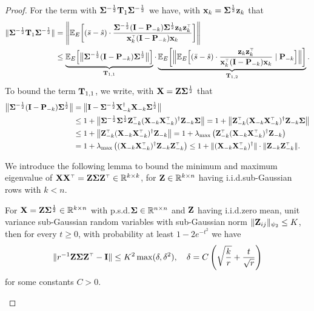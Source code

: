 \documentclass[11pt]{article}
\begin{document}
\begin{proof}
For the term with $\mathbf{\Sigma}^{-\frac12}\mathbf{T}_1 \mathbf{\Sigma}^{-\frac12}$ we have, with $\mathbf x_k = \mathbf{\Sigma}^{\frac12} \mathbf z_k$ that
\begin{align*}
      \|\Sigmab^{-\frac12}\T_1 \Sigmab^{-\frac12}\| &=  \left\| \E_E\bigg[(\bar s - \hat s)\cdot
            \frac{ \Sigmab^{-\frac12} ( \I - \P_{-k}) \Sigmab^{\frac12} \z_k\z_k^\top}{\x_k^\top ( \I - \P_{-k}) \x_k}\bigg] \right\|\\
      &\leq
     \underbrace{\E_E\Big[\big\|\Sigmab^{-\frac12} (\I - \P_{-k}) \Sigmab^{\frac12}\big\|\Big]}_{\T_{1,1}}
     \cdot
     \underbrace{\E_E\bigg[\Big\|\E_E\Big[(\bar s- \hat s)\cdot
     \frac{\z_k\z_k^\top}{\x_k^\top (\I - \P_{-k}) \x_k}\mid
     \P_{-k}\Big]\Big\|\bigg]}_{\T_{1,2}}.
\end{align*}
To bound the term $\mathbf{T}_{1,1}$, we write, with $\mathbf X = \mathbf Z \mathbf{\Sigma}^{\frac12}$ that
\begin{align*}
 \big\|\Sigmab^{-\frac12}( \I -\P_{-k}) \Sigmab^{\frac12}\big\|
 &= \big\|\I -
   \Sigmab^{-\frac12}\X_{-k}^\dagger\X_{-k}\Sigmab^{\frac12}\big\|
 \\
 &\leq 1 +
   \big\|\Sigmab^{-\frac12}\Sigmab^{\frac12}\Z_{-k}^\top(\X_{-k}\X_{-k}^\top)^{\dagger}\Z_{-k}\Sigmab\big\| = 1 + \big\|\Z_{-k}^\top(\X_{-k}\X_{-k}^\top)^{\dagger}\Z_{-k}\Sigmab\big\| \\ 
 &\le 1 + \big\|\Z_{-k}^\top(\X_{-k}\X_{-k}^\top)^{\dagger}\Z_{-k}\big\| = 1 + \lambda_{\max} \left( \Z_{-k}^\top(\X_{-k}\X_{-k}^\top)^{\dagger}\Z_{-k} \right) \\ 
 &= 1 + \lambda_{\max} \left( (\X_{-k}\X_{-k}^\top)^{\dagger}\Z_{-k} \Z_{-k}^\top \right) \le 1 + \| (\X_{-k}\X_{-k}^\top)^\dagger \| \cdot \| \Z_{-k} \Z_{-k}^\top \|.
\end{align*}

We introduce the following lemma to bound the minimum and maximum eigenvalue of $\X \X^\top = \Z \Sigmab \Z^\top \in \R^{k \times k}$, for $\mathbf Z \in \mathbb R^{k \times n}$ having i.i.d.\@ sub-Gaussian rows with $k < n$.

\begin{lemma}\label{lem:eig-bound-Gram}\label{lem:eig-bound}
For $\mathbf X = \mathbf Z \mathbf{\Sigma}^{\frac12} \in \mathbb R^{k \times n}$ with p.s.d.\@ $\mathbf{\Sigma} \in \mathbb R^{n \times n}$ and $\mathbf Z$ having i.i.d.\@ zero mean, unit variance sub-Gaussian random variables with sub-Gaussian norm $\| \mathbf Z_{ij} \|_{\psi_2} \le K$, then for every $t \ge 0$, with probability at least $1 - 2 e^{-t^2}$ we have
\begin{equation}\label{eq:lem-eig-Gram}
  \| r^{-1} \Z \Sigmab \Z^\top - \I \| \le K^2 \max(\delta, \delta^2), \quad \delta = C \left( \sqrt{ \frac{k}{r} } + \frac{t}{\sqrt r} \right)
\end{equation}
for some constants $C > 0$. %
\end{lemma}


\end{proof}
\end{document}
